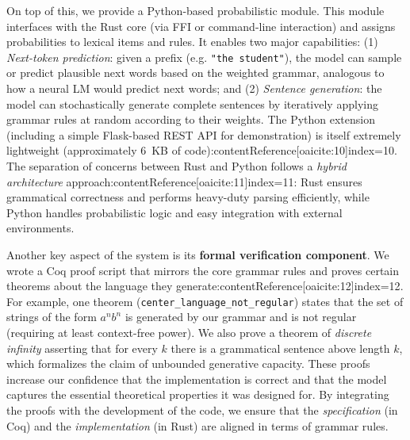 \documentclass[11pt]{article}
\begin{document}
On top of this, we provide a Python-based probabilistic module. This module interfaces with the Rust core (via FFI or command-line interaction) and assigns probabilities to lexical items and rules. It enables two major capabilities: (1) \emph{Next-token prediction}: given a prefix (e.g. \texttt{"the student"}), the model can sample or predict plausible next words based on the weighted grammar, analogous to how a neural LM would predict next words; and (2) \emph{Sentence generation}: the model can stochastically generate complete sentences by iteratively applying grammar rules at random according to their weights. The Python extension (including a simple Flask-based REST API for demonstration) is itself extremely lightweight (approximately 6~KB of code):contentReference[oaicite:10]{index=10}. The separation of concerns between Rust and Python follows a \emph{hybrid architecture} approach:contentReference[oaicite:11]{index=11}: Rust ensures grammatical correctness and performs heavy-duty parsing efficiently, while Python handles probabilistic logic and easy integration with external environments.

Another key aspect of the system is its \textbf{formal verification component}. We wrote a Coq proof script that mirrors the core grammar rules and proves certain theorems about the language they generate:contentReference[oaicite:12]{index=12}. For example, one theorem (\texttt{center\_language\_not\_regular}) states that the set of strings of the form $a^n b^n$ is generated by our grammar and is not regular (requiring at least context-free power). We also prove a theorem of \emph{discrete infinity} asserting that for every $k$ there is a grammatical sentence above length $k$, which formalizes the claim of unbounded generative capacity. These proofs increase our confidence that the implementation is correct and that the model captures the essential theoretical properties it was designed for. By integrating the proofs with the development of the code, we ensure that the \textit{specification} (in Coq) and the \textit{implementation} (in Rust) are aligned in terms of grammar rules.
\end{document}
